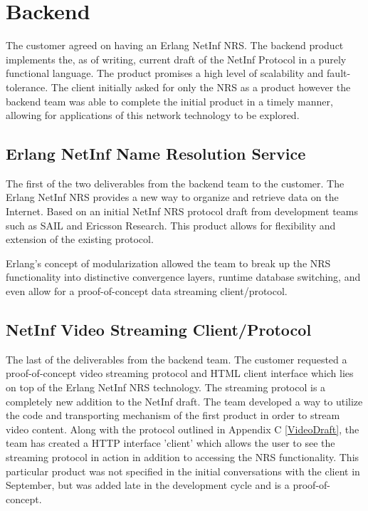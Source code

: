 \section {Backend}

The customer agreed on having an Erlang NetInf NRS. The backend product implements the, as of writing, current draft of the NetInf Protocol\cite{netinfproto} in a purely functional language. The product promises a high level of scalability and fault-tolerance. The client initially asked for only the NRS as a product however the backend team was able to complete the initial product in a timely manner, allowing for applications of this network technology to be explored. 


\subsection {Erlang NetInf Name Resolution Service}
The first of the two deliverables from the backend team to the customer. The Erlang NetInf NRS provides a new way to organize and retrieve data on the Internet. Based on an initial NetInf NRS protocol draft from development teams such as SAIL and Ericsson Research\cite{netinfproto}. This product allows for flexibility and extension of the existing protocol.

Erlang's concept of modularization allowed the team to break up the NRS functionality into distinctive convergence layers, runtime database switching, and even allow for a proof-of-concept data streaming client/protocol. 

\subsection{NetInf Video Streaming Client/Protocol}

The last of the deliverables from the backend team. The customer requested a proof-of-concept video streaming protocol and HTML client interface which lies on top of the Erlang NetInf NRS technology. The streaming protocol is a completely new addition to the NetInf draft. The team developed a way to utilize the code and transporting mechanism of the first product in order to stream video content. Along with the protocol outlined in Appendix C \ref{VideoDraft}, the team has created a HTTP interface 'client' which allows the user to see the streaming protocol in action in addition to accessing the NRS functionality. This particular product was not specified in the initial conversations with the client in September, but was added late in the development cycle and is a proof-of-concept.

